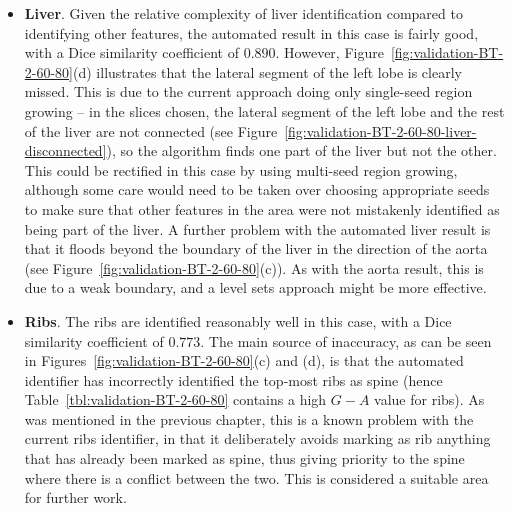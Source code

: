 \begin{itemize}
\item \textbf{Liver}. Given the relative complexity of liver identification compared to identifying other features, the automated result in this case is fairly good, with a Dice similarity coefficient of $0.890$. However, Figure~\ref{fig:validation-BT-2-60-80}(d) illustrates that the lateral segment of the left lobe is clearly missed. This is due to the current approach doing only single-seed region growing -- in the slices chosen, the lateral segment of the left lobe and the rest of the liver are not connected (see Figure~\ref{fig:validation-BT-2-60-80-liver-disconnected}), so the algorithm finds one part of the liver but not the other. This could be rectified in this case by using multi-seed region growing, although some care would need to be taken over choosing appropriate seeds to make sure that other features in the area were not mistakenly identified as being part of the liver. A further problem with the automated liver result is that it floods beyond the boundary of the liver in the direction of the aorta (see Figure~\ref{fig:validation-BT-2-60-80}(c)). As with the aorta result, this is due to a weak boundary, and a level sets approach might be more effective.

\item \textbf{Ribs}. The ribs are identified reasonably well in this case, with a Dice similarity coefficient of $0.773$. The main source of inaccuracy, as can be seen in Figures~\ref{fig:validation-BT-2-60-80}(c) and (d), is that the automated identifier has incorrectly identified the top-most ribs as spine (hence Table~\ref{tbl:validation-BT-2-60-80} contains a high $G - A$ value for ribs). As was mentioned in the previous chapter, this is a known problem with the current ribs identifier, in that it deliberately avoids marking as rib anything that has already been marked as spine, thus giving priority to the spine where there is a conflict between the two. This is considered a suitable area for further work.


\end{itemize}
